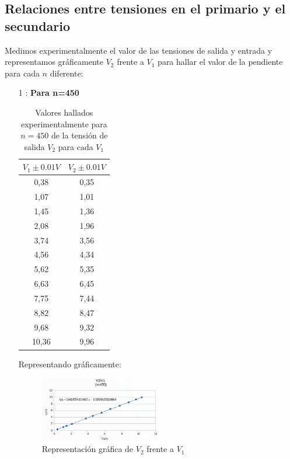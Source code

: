 \documentclass[11pt,letterpaper,twocolumn]{article}
\begin{document}
\subsection{Relaciones entre tensiones en el primario y el secundario}%
\label{sec:}
Medimos experimentalmente el valor de las tensiones de salida y entrada y representamos gráficamente $V_2$ frente a $V_1$ para hallar el valor de la pendiente para cada $n$ diferente:
\newpage
\begin{itemize}
	\item[1]: \textbf{Para n=450}
		\begin{table}[H]
			\centering
			\caption{Valores hallados experimentalmente para $n=450$ de la tensión de salida $V_2$ para cada $V_1$}
			\begin{tabular}{|c|c|}
				\hline
				\multicolumn{1}{|l|}{$V_1 \pm 0.01 V$} & \multicolumn{1}{l|}{$V_2 \pm 0.01 V$} \\ \hline
				0,38 & 0,35 \\ 
				1,07 & 1,01 \\ 
				1,45 & 1,36 \\ 
				2,08 & 1,96 \\
				3,74 & 3,56 \\
				4,56 & 4,34 \\
				5,62 & 5,35 \\ 
				6,63 & 6,45 \\
				7,75 & 7,44 \\
				8,82 & 8,47 \\
				9,68 & 9,32 \\
				10,36 & 9,96 \\ \hline
			\end{tabular}
			\label{}
		\end{table}

			Representando gráficamente:

\begin{figure}[H]
			\centering
			\includegraphics[width=0.5\textwidth]{v450.png}
			\caption{Representación gráfica de $V_2$ frente a $V_1$}
			\label{fig:v2v1450-png}
		\end{figure}
\end{itemize}
\end{document}
